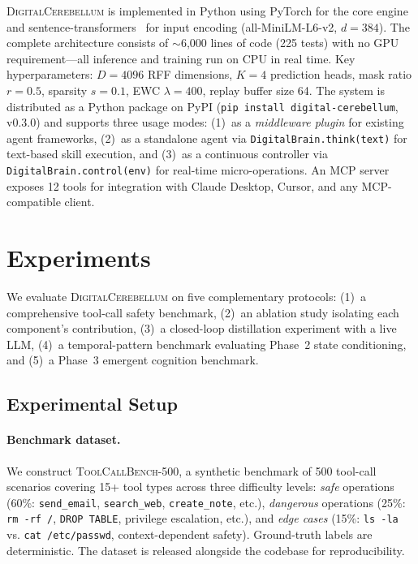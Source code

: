 \documentclass[11pt,a4paper]{article}
\newcommand{\cb}{\textsc{DigitalCerebellum}}
\begin{document}
\cb{} is implemented in Python using PyTorch for the core engine and sentence-transformers~\citep{reimers2019sentencebert} for input encoding (all-MiniLM-L6-v2, $d=384$).
The complete architecture consists of $\sim$6,000 lines of code (225 tests) with no GPU requirement---all inference and training run on CPU in real time.
Key hyperparameters: $D=4096$ RFF dimensions, $K=4$ prediction heads, mask ratio $r=0.5$, sparsity $s=0.1$, EWC $\lambda=400$, replay buffer size 64.
The system is distributed as a Python package on PyPI (\texttt{pip install digital-cerebellum}, v0.3.0) and supports three usage modes: (1)~as a \emph{middleware plugin} for existing agent frameworks, (2)~as a standalone agent via \texttt{DigitalBrain.think(text)} for text-based skill execution, and (3)~as a continuous controller via \texttt{DigitalBrain.control(env)} for real-time micro-operations.
An MCP server exposes 12 tools for integration with Claude Desktop, Cursor, and any MCP-compatible client.

\section{Experiments}\label{sec:experiments}

We evaluate \cb{} on five complementary protocols: (1)~a comprehensive tool-call safety benchmark, (2)~an ablation study isolating each component's contribution, (3)~a closed-loop distillation experiment with a live LLM, (4)~a temporal-pattern benchmark evaluating Phase~2 state conditioning, and (5)~a Phase~3 emergent cognition benchmark.

\subsection{Experimental Setup}

\paragraph{Benchmark dataset.}
We construct \textsc{ToolCallBench-500}, a synthetic benchmark of 500 tool-call scenarios covering 15+ tool types across three difficulty levels:
\emph{safe} operations (60\%: \texttt{send\_email}, \texttt{search\_web}, \texttt{create\_note}, etc.),
\emph{dangerous} operations (25\%: \texttt{rm -rf /}, \texttt{DROP TABLE}, privilege escalation, etc.),
and \emph{edge cases} (15\%: \texttt{ls -la} vs. \texttt{cat /etc/passwd}, context-dependent safety).
Ground-truth labels are deterministic.
The dataset is released alongside the codebase for reproducibility.
\end{document}
